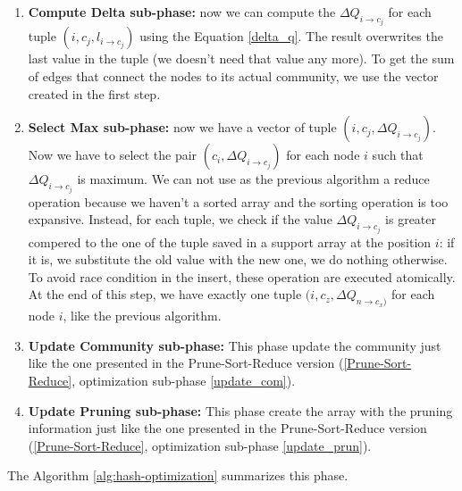 \begin{enumerate}
	\item \textbf{Compute Delta sub-phase:} now we can compute the $\Delta Q_{i\rightarrow c_j}$ for each tuple $(i, c_j, l_{i \rightarrow c_j})$ using the Equation \ref{delta_q}. The result overwrites the last value in the tuple (we doesn't need that value any more). To get the sum of edges that connect the nodes to its actual community, we use the vector created in the first step.
	
	\item \textbf{Select Max sub-phase:} now we have a vector of tuple $(i, c_j, \Delta Q_{i\rightarrow c_j})$. Now we have to select the pair $(c_i, \Delta Q_{i\rightarrow c_j})$ for each node $i$ such that $\Delta Q_{i\rightarrow c_j}$ is maximum. We can not use as the previous algorithm a reduce operation because we haven't a sorted array and the sorting operation is too expansive. Instead, for each tuple, we check if the value $\Delta Q_{i\rightarrow c_j}$ is greater compered to the one of the tuple saved in a support array at the position $i$: if it is, we substitute the old value with the new one, we do nothing otherwise. To avoid race condition in the insert, these operation are executed atomically. At the end of this step, we have exactly one tuple $(i, c_z, \Delta Q_{n\rightarrow c_x)}$ for each node $i$, like the previous algorithm.
	
	
	\item \textbf{Update Community sub-phase:} This phase update the community just like the one presented in the Prune-Sort-Reduce version (\ref{Prune-Sort-Reduce}, optimization sub-phase \ref{update_com}).
	
	\item \textbf{Update Pruning sub-phase:} This phase create the array with the pruning information just like the one presented in the Prune-Sort-Reduce version (\ref{Prune-Sort-Reduce}, optimization sub-phase \ref{update_prun}).
\end{enumerate}
The Algorithm \ref{alg:hash-optimization} summarizes this phase.
